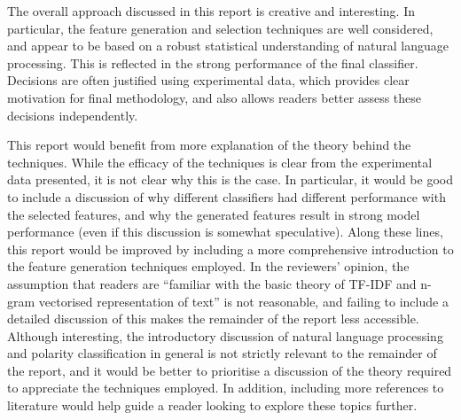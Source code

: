 \documentclass[11pt]{article}
\begin{document}
The overall approach discussed in this report is creative and interesting. In particular, the feature generation and selection techniques are well considered, and appear to be based on a robust statistical understanding of natural language processing. This is reflected in the strong performance of the final classifier. Decisions are often justified using experimental data, which provides clear motivation for final methodology, and also allows readers better assess these decisions independently.

This report would benefit from more explanation of the theory behind the techniques. While the efficacy of the techniques is clear from the experimental data presented, it is not clear why this is the case. In particular, it would be good to include a discussion of why different classifiers had different performance with the selected features, and why the generated features result in strong model performance (even if this discussion is somewhat speculative). Along these lines, this report would be improved by including a more comprehensive introduction to the feature generation techniques employed. In the reviewers' opinion, the assumption that readers are ``familiar with the basic theory of TF-IDF and n-gram vectorised representation of text'' is not reasonable, and failing to include a detailed discussion of this makes the remainder of the report less accessible. Although interesting, the introductory discussion of natural language processing and polarity classification in general is not strictly relevant to the remainder of the report, and it would be better to prioritise a discussion of the theory required to appreciate the techniques employed. In addition, including more references to literature would help guide a reader looking to explore these topics further.
\end{document}

